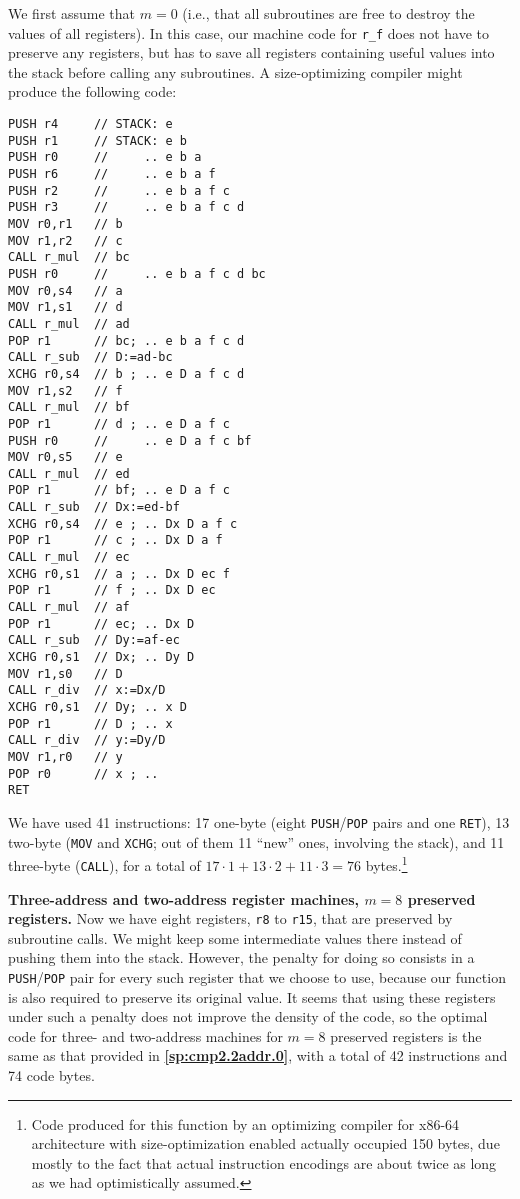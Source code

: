 \documentclass[12pt,oneside]{article}
\def\makepoint#1{\medbreak\noindent{\bf #1.\ }}
\def\nxsubpoint{\refstepcounter{subsubsection}%
  \smallbreak\makepoint{\thesubsubsection}}
\def\refpoint#1{{\rm\textbf{\ref{#1}}}}
\let\ptref=\refpoint
\def\emb#1{\textbf{#1.}}
\begin{document}
We first assume that $m=0$ (i.e., that all subroutines are free to destroy the values of all registers). In this case, our machine code for \texttt{r\_f} does not have to preserve any registers, but has to save all registers containing useful values into the stack before calling any subroutines. A size-optimizing compiler might produce the following code:
\begin{verbatim}
PUSH r4     // STACK: e
PUSH r1     // STACK: e b
PUSH r0     //     .. e b a
PUSH r6     //     .. e b a f
PUSH r2     //     .. e b a f c
PUSH r3     //     .. e b a f c d
MOV r0,r1   // b
MOV r1,r2   // c
CALL r_mul  // bc
PUSH r0     //     .. e b a f c d bc
MOV r0,s4   // a
MOV r1,s1   // d
CALL r_mul  // ad
POP r1      // bc; .. e b a f c d
CALL r_sub  // D:=ad-bc
XCHG r0,s4  // b ; .. e D a f c d
MOV r1,s2   // f
CALL r_mul  // bf
POP r1      // d ; .. e D a f c
PUSH r0     //     .. e D a f c bf
MOV r0,s5   // e
CALL r_mul  // ed
POP r1      // bf; .. e D a f c
CALL r_sub  // Dx:=ed-bf
XCHG r0,s4  // e ; .. Dx D a f c
POP r1      // c ; .. Dx D a f
CALL r_mul  // ec
XCHG r0,s1  // a ; .. Dx D ec f
POP r1      // f ; .. Dx D ec
CALL r_mul  // af
POP r1      // ec; .. Dx D
CALL r_sub  // Dy:=af-ec
XCHG r0,s1  // Dx; .. Dy D
MOV r1,s0   // D
CALL r_div  // x:=Dx/D
XCHG r0,s1  // Dy; .. x D
POP r1      // D ; .. x
CALL r_div  // y:=Dy/D
MOV r1,r0   // y
POP r0      // x ; ..
RET
\end{verbatim}
We have used 41 instructions: 17 one-byte (eight \texttt{PUSH}/\texttt{POP} pairs and one \texttt{RET}), 13 two-byte (\texttt{MOV} and \texttt{XCHG}; out of them 11 ``new'' ones, involving the stack), and 11 three-byte (\texttt{CALL}), for a total of $17\cdot1+13\cdot2+11\cdot3=76$ bytes.\footnote{Code produced for this function by an optimizing compiler for x86-64 architecture with size-optimization enabled actually occupied 150 bytes, due mostly to the fact that actual instruction encodings are about twice as long as we had optimistically assumed.}

\nxsubpoint\label{sp:cmp2.2addr.8}\emb{Three-address and two-address register machines, $m=8$ preserved registers}
Now we have eight registers, \texttt{r8} to \texttt{r15}, that are preserved by subroutine calls. We might keep some intermediate values there instead of pushing them into the stack. However, the penalty for doing so consists in a \texttt{PUSH}/\texttt{POP} pair for every such register that we choose to use, because our function is also required to preserve its original value. It seems that using these registers under such a penalty does not improve the density of the code, so the optimal code for three- and two-address machines for $m=8$ preserved registers is the same as that provided in \ptref{sp:cmp2.2addr.0}, with a total of 42 instructions and 74 code bytes.
\end{document}
